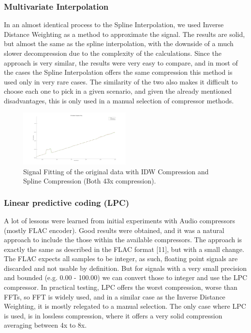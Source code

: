 \documentclass[conference]{IEEEtran}
\begin{document}
\vspace{10pt}
\subsubsection{Multivariate Interpolation}

In an almost identical process to the Spline Interpolation, we used Inverse Distance Weighting as a method to approximate the signal.
The results are solid, but almost the same as the spline interpolation, with the downside of a much slower decompression due to the complexity of the calculations.
Since the approach is very similar, the results were very easy to compare, and in most of the cases the Spline Interpolation offers the same compression this method is used
only in very rare cases.
The similarity of the two also makes it difficult to choose each one to pick in a given scenario, and given the already mentioned disadvantages, this is only used in a manual selection of compressor methods.

\begin{figure}[ht]
  \centering
  \includegraphics[width=0.5\textwidth]{IDW_Spline_Comparison.png}
  \caption{Signal Fitting of the original data with IDW Compression and Spline Compression (Both 43x compression).}
  \label{Fig.4}
\end{figure}
\vspace{5pt}

\vspace{10pt}
\subsubsection{Linear predictive coding (LPC)}

A lot of lessons were learned from initial experiments with Audio compressors (mostly FLAC encoder).
Good results were obtained, and it was a natural approach to include the those within the available compressors.
The approach is exactly the same as described in the FLAC format [11], but with a small change.
The FLAC expects all samples to be integer, as such, floating point signals are discarded and not usable by definition.
But for signals with a very small precision and bounded (e.g. 0.00 - 100.00) we can convert those to integer and use the LPC compressor.
In practical testing, LPC offers the worst compression, worse than FFTs, so FFT is widely used, and in a similar case as the Inverse Distance Weighting, it is mostly relegated to a manual selection.
The only case where LPC is used, is in lossless compression, where it offers a very solid compression averaging between 4x to 8x.
\end{document}
